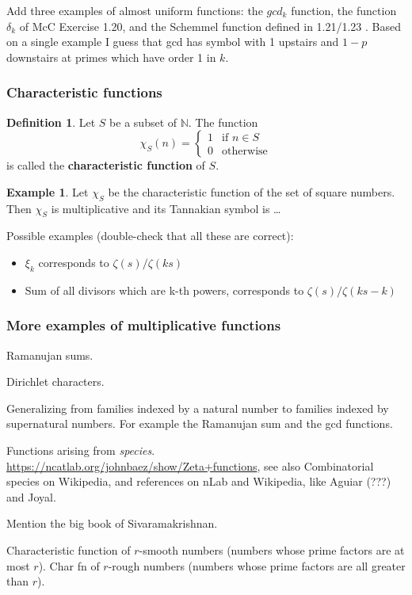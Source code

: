 \documentclass[a4paper]{article}
\theoremstyle{definition}
\newtheorem{definition}{Definition}[section]
\newtheorem{example}{Example}[section]
\theoremstyle{remark}
\newcommand{\N}{\mathbb{N}}
\newcommand{\defhl}[1]{\textbf{#1}}
\newcommand{\twopartdef}[4]
{
	\left\{
		\begin{array}{ll}
			#1 & \mbox{if } #2 \\
			#3 & \mbox{} #4
		\end{array}
	\right.
}
\begin{document}
Add three examples of almost uniform functions: the $gcd_k$ function, the function $\delta_k$ of McC Exercise 1.20, and the Schemmel function defined in 1.21/1.23 . Based on a single example I guess that gcd has symbol with 1 upstairs and $1-p$ downstairs at primes which have order 1 in $k$. 


\subsubsection{Characteristic functions}

\begin{definition}
Let $S$ be a subset of $\N$. The function
$$  \chi_S(n) =  \twopartdef { 1 } { n \in S } {0}  { \textrm{otherwise}} $$
is called the \defhl{characteristic function} of $S$.
\end{definition}

\begin{example}
Let $\chi_S$ be the characteristic function of the set of square numbers. Then $\chi_S$ is multiplicative and its Tannakian symbol is \ldots
\end{example}


Possible examples (double-check that all these are correct):
\begin{itemize}
\item $\xi_k$ corresponds to $\zeta(s)/ \zeta(ks)$
\item Sum of all divisors which are k-th powers, corresponds to $\zeta(s) / \zeta(ks-k)$
\end{itemize}

\subsubsection{More examples of multiplicative functions}

Ramanujan sums.

Dirichlet characters.

Generalizing from families indexed by a natural number to families indexed by supernatural numbers. For example the Ramanujan sum and the gcd functions.

Functions arising from \emph{species}. \url{https://ncatlab.org/johnbaez/show/Zeta+functions}, see also Combinatorial species on Wikipedia, and references on nLab and Wikipedia, like Aguiar (???) and Joyal. 

Mention the big book of Sivaramakrishnan.

Characteristic function of $r$-smooth numbers (numbers whose prime factors are at most $r$). Char fn of $r$-rough numbers (numbers whose prime factors are all greater than $r$).
\end{document}

